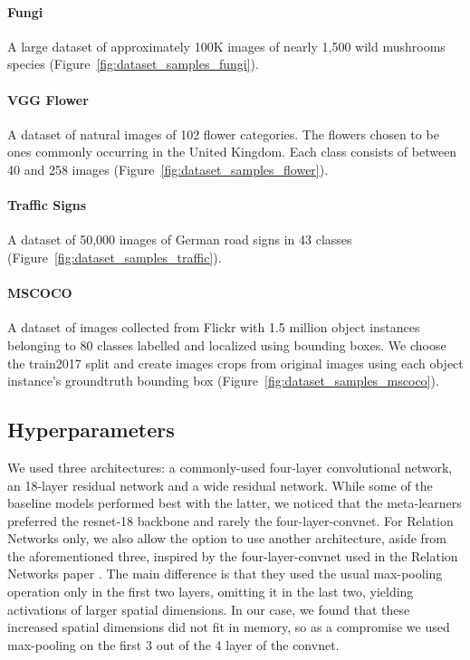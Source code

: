 \documentclass{article} \usepackage{iclr2020_conference,times}
\begin{document}
\paragraph{Fungi \citep{fungi}} A large dataset of approximately 100K images of
nearly 1,500 wild mushrooms species (Figure~\ref{fig:dataset_samples_fungi}).

\paragraph{VGG Flower \citep{Nilsback08}} A dataset of natural images of 102
flower categories. The flowers chosen to be ones commonly occurring in the
United Kingdom. Each class consists of between 40 and 258 images
(Figure~\ref{fig:dataset_samples_flower}).

\paragraph{Traffic Signs \citep{Houben-IJCNN-2013}} A dataset of 50,000 images
of German road signs in 43 classes (Figure~\ref{fig:dataset_samples_traffic}).

\paragraph{MSCOCO \cite{lin2014microsoft}} A dataset of images collected from
Flickr with 1.5 million object instances belonging to 80 classes labelled and
localized using bounding boxes. We choose the train2017 split and create images
crops from original images using each object instance's groundtruth bounding
box (Figure~\ref{fig:dataset_samples_mscoco}).

\subsection{Hyperparameters}
We used three architectures: a commonly-used four-layer convolutional network,
an 18-layer residual network and a wide residual network. While some of the
baseline models performed best with the latter, we noticed that the
meta-learners preferred the resnet-18 backbone and rarely the
four-layer-convnet.
For Relation Networks only, we also allow the option to use another
architecture, aside from the aforementioned three, inspired by the
four-layer-convnet used in the Relation Networks paper
\citep{sung2018learning}.
The main difference is that they used the usual max-pooling operation only in
the first two layers, omitting it in the last two, yielding activations of
larger spatial dimensions. In our case, we found that these increased spatial
dimensions did not fit in memory, so as a compromise we used max-pooling on the
first 3 out of the 4 layer of the convnet.
\end{document}
